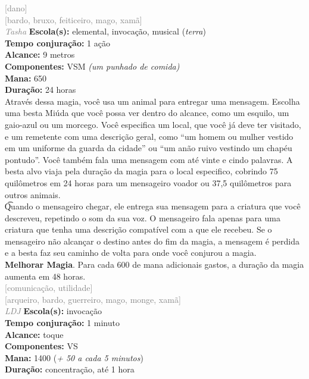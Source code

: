 \documentclass{RPG_Adventure}[2021/10/20]
\begin{document}
{\scriptsize \textcolor{gray}{[dano]\\}}
{\scriptsize \textcolor{gray}{[bardo, bruxo, feiticeiro, mago, xamã]\\}}
{\tiny \textcolor{gray}{\textit{Tasha}}}\jump{}
{\small \t \textbf{Escola(s):} elemental, invocação, musical (\textit{terra})\\\t \textbf{Tempo conjuração:} 1 ação\\\t \textbf{Alcance:} 9 metros\\\t \textbf{Componentes:} VSM \textit{(um punhado de comida)}\\\t \textbf{Mana:} 650\\\t \textbf{Duração:} 24 horas\\}
{\normalsize Através dessa magia, você usa um animal para entregar uma mensagem. Escolha uma besta Miúda que você possa ver dentro do alcance, como um esquilo, um gaio-azul ou um morcego. Você especifica um local, que você já deve ter visitado, e um remetente com uma descrição geral, como “um homem ou mulher vestido em um uniforme da guarda da cidade” ou “um anão ruivo vestindo um chapéu pontudo”. Você também fala uma mensagem com até vinte e cindo palavras. A besta alvo viaja pela duração da magia para o local especifico, cobrindo 75 quilômetros em 24 horas para um mensageiro voador ou 37,5 quilômetros para outros animais.\\\t Quando o mensageiro chegar, ele entrega sua mensagem para a criatura que você descreveu, repetindo o som da sua voz. O mensageiro fala apenas para uma criatura que tenha uma descrição compatível com a que ele recebeu. Se o mensageiro não alcançar o destino antes do fim da magia, a mensagem é perdida e a besta faz seu caminho de volta para onde você conjurou a magia.\\\t \textbf{Melhorar Magia}. Para cada 600 de mana adicionais gastos, a duração da magia aumenta em 48 horas.\\}
{\scriptsize \textcolor{gray}{[comunicação, utilidade]\\}}
{\scriptsize \textcolor{gray}{[arqueiro, bardo, guerreiro, mago, monge, xamã]\\}}
{\tiny \textcolor{gray}{\textit{LDJ}}}\jump{}
{\small \t \textbf{Escola(s):} invocação\\\t \textbf{Tempo conjuração:} 1 minuto\\\t \textbf{Alcance:} toque\\\t \textbf{Componentes:} VS\\\t \textbf{Mana:} 1400 (\textit{+ 50 a cada 5 minutos})\\\t \textbf{Duração:} concentração, até 1 hora\\}
\end{document}
